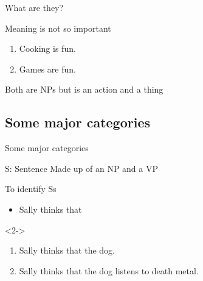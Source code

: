 \documentclass{beamer}
\newcommand{\suboneone}{What are they?}
\newcommand{\subonetwo}{Some major categories}
\begin{document}
      \begin{frame}{\suboneone}
        \begin{block}{}
          Meaning is not so important
        \end{block}
        \begin{example}
          \begin{enumerate}
            \item Cooking is fun.
            \item Games are fun.
          \end{enumerate}
        \end{example}
        \begin{block}{}
          Both are NPs but  is an action and  a thing
        \end{block}
      \end{frame}

    \subsection{\subonetwo}
      \begin{frame}{\subonetwo}
        \begin{block}{S: Sentence}
          Made up of an NP and a VP
        \end{block}
        \begin{block}{To identify Ss}
          \begin{itemize}
            \item Sally thinks that \hrulefill
          \end{itemize}
        \end{block}
        \begin{example}<2->
          \begin{enumerate}
            \item {}Sally thinks that the dog.
            \item Sally thinks that the dog listens to death metal.
          \end{enumerate}
        \end{example}
      \end{frame}
\end{document}
